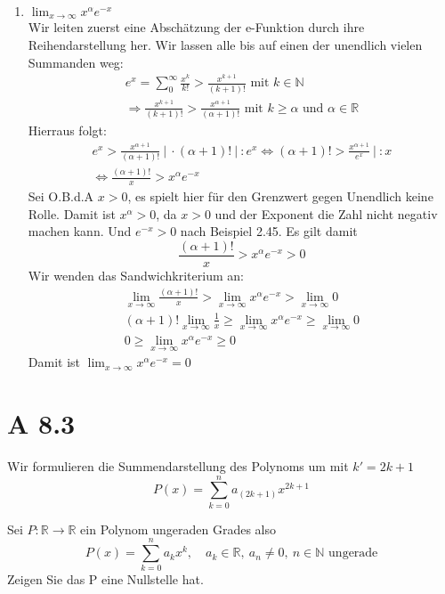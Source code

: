 \documentclass{article}
\begin{document}
\begin{enumerate}[ label = (\roman*) ]
        \item \( \lim_{x \to \infty} x^{\alpha} e^{-x}\) \\
        Wir leiten zuerst eine Abschätzung der e-Funktion durch ihre Reihendarstellung her. Wir lassen alle bis auf einen der unendlich vielen Summanden weg:
        \begin{gather*}
            e^x = \sum_0^{\infty} \frac{x^k}{k!} > \frac{x^{k+1}}{(k+1)!} \text{ mit } k \in \mathbb{N} \\
            \Rightarrow \frac{x^{k+1}}{(k+1)!} > \frac{x^{\alpha +1}}{(\alpha + 1)!} \text{ mit } k \geq \alpha \text{ und } \alpha \in \mathbb{R}
        \end{gather*}
        Hierraus folgt:
        \begin{gather*}
            e^x > \frac{x^{\alpha +1}}{(\alpha + 1)!} \ | \ \cdot (\alpha + 1)! \ | \ :  e^x
            \Leftrightarrow (\alpha + 1)! > \frac{x^{\alpha +1}}{e^x} \ | \ :x \\
            \Leftrightarrow \frac{(\alpha+1)!}{x} > x^{\alpha} e^{-x}
        \end{gather*}
        Sei O.B.d.A \(x > 0\), es spielt hier für den Grenzwert gegen Unendlich keine Rolle.
        Damit ist \(x^{\alpha} > 0\), da \(x > 0\) und der Exponent die Zahl nicht negativ machen kann. Und \(e^{-x} > 0\) nach Beispiel 2.45.
        Es gilt damit
        \[ \frac{(\alpha+1)!}{x} > x^{\alpha} e^{-x} > 0 \]
        Wir wenden das Sandwichkriterium an:
        \begin{gather*}
            \lim_{x \to \infty} \frac{(\alpha+1)!}{x} > \lim_{x \to \infty} x^{\alpha} e^{-x} > \lim_{x \to \infty} 0 \\
            (\alpha+1)! \lim_{x \to \infty} \frac{1}{x} \geq \lim_{x \to \infty} x^{\alpha} e^{-x} \geq \lim_{x \to \infty} 0 \\
            0 \geq \lim_{x \to \infty} x^{\alpha} e^{-x} \geq 0
        \end{gather*}
        Damit ist \( \lim_{x \to \infty} x^{\alpha} e^{-x} = 0\)

    \end{enumerate}

    \section*{A 8.3}
    Wir formulieren die Summendarstellung des Polynoms um mit \(k' = 2k + 1\)
    \[P(x) = \sum_{k=0}^{n} a_{(2k + 1)} x^{2k + 1} \]

    Sei \(P: \mathbb{R} \to \mathbb{R}\) ein Polynom ungeraden Grades also
    \[P(x) = \sum_{k=0}^{n} a_k x^{k}, \quad a_k \in \mathbb{R}, \ a_n \neq 0, \ n \in \mathbb{N} \text{ ungerade}\]
    Zeigen Sie das P eine Nullstelle hat.
    
\end{document}

